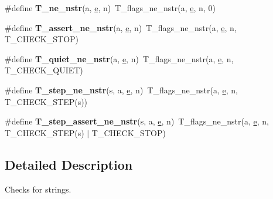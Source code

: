 \begin{DoxyCompactItemize}
\item 
\mbox{\label{group__RTEMSTestFrameworkChecksStr_gaab0007dd94cf485b1ba2a1d3a8b369ee}} 
\#define {\bfseries T\+\_\+ne\+\_\+nstr}(a,  \mbox{\hyperlink{sun4u_2tte_8h_a8b0b9ed08e0e18920ec2682f48228c27}{e}},  n)~T\+\_\+flags\+\_\+ne\+\_\+nstr(a, \mbox{\hyperlink{sun4u_2tte_8h_a8b0b9ed08e0e18920ec2682f48228c27}{e}}, n, 0)
\item 
\mbox{\label{group__RTEMSTestFrameworkChecksStr_ga490bc79b83590a515c967c5d3c201b44}} 
\#define {\bfseries T\+\_\+assert\+\_\+ne\+\_\+nstr}(a,  \mbox{\hyperlink{sun4u_2tte_8h_a8b0b9ed08e0e18920ec2682f48228c27}{e}},  n)~T\+\_\+flags\+\_\+ne\+\_\+nstr(a, \mbox{\hyperlink{sun4u_2tte_8h_a8b0b9ed08e0e18920ec2682f48228c27}{e}}, n, T\+\_\+\+C\+H\+E\+C\+K\+\_\+\+S\+T\+OP)
\item 
\mbox{\label{group__RTEMSTestFrameworkChecksStr_gaaa947dfe7b0ba268078f2e793c8b7644}} 
\#define {\bfseries T\+\_\+quiet\+\_\+ne\+\_\+nstr}(a,  \mbox{\hyperlink{sun4u_2tte_8h_a8b0b9ed08e0e18920ec2682f48228c27}{e}},  n)~T\+\_\+flags\+\_\+ne\+\_\+nstr(a, \mbox{\hyperlink{sun4u_2tte_8h_a8b0b9ed08e0e18920ec2682f48228c27}{e}}, n, T\+\_\+\+C\+H\+E\+C\+K\+\_\+\+Q\+U\+I\+ET)
\item 
\mbox{\label{group__RTEMSTestFrameworkChecksStr_gaa065dadbeb1aa2b2b19733be64136ac9}} 
\#define {\bfseries T\+\_\+step\+\_\+ne\+\_\+nstr}(s,  a,  \mbox{\hyperlink{sun4u_2tte_8h_a8b0b9ed08e0e18920ec2682f48228c27}{e}},  n)~T\+\_\+flags\+\_\+ne\+\_\+nstr(a, \mbox{\hyperlink{sun4u_2tte_8h_a8b0b9ed08e0e18920ec2682f48228c27}{e}}, n, T\+\_\+\+C\+H\+E\+C\+K\+\_\+\+S\+T\+EP(s))
\item 
\mbox{\label{group__RTEMSTestFrameworkChecksStr_ga54e3f08527d5a711bb0450cd0ae41efb}} 
\#define {\bfseries T\+\_\+step\+\_\+assert\+\_\+ne\+\_\+nstr}(s,  a,  \mbox{\hyperlink{sun4u_2tte_8h_a8b0b9ed08e0e18920ec2682f48228c27}{e}},  n)~T\+\_\+flags\+\_\+ne\+\_\+nstr(a, \mbox{\hyperlink{sun4u_2tte_8h_a8b0b9ed08e0e18920ec2682f48228c27}{e}}, n, T\+\_\+\+C\+H\+E\+C\+K\+\_\+\+S\+T\+EP(s) $\vert$ T\+\_\+\+C\+H\+E\+C\+K\+\_\+\+S\+T\+OP)
\end{DoxyCompactItemize}


\subsection{Detailed Description}
Checks for strings. 


